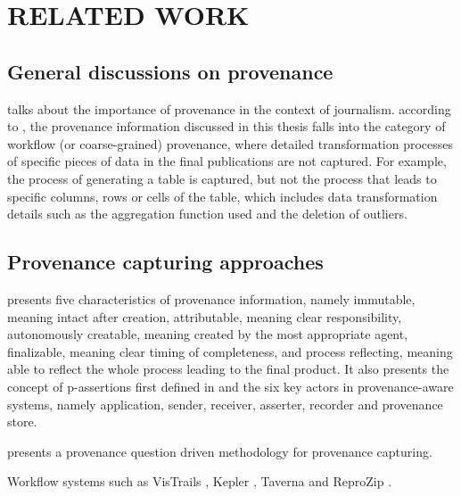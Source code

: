 
\chapter{RELATED WORK}

\section{General discussions on provenance}
\cite{jarvis2010importance} talks about the importance of provenance in the context of journalism. 
according to \cite{tan2007provenance}, the provenance information discussed in this thesis falls into the category of workflow (or coarse-grained) provenance, where detailed transformation processes of specific pieces of data in the final publications are not captured. For example, the process of generating a table is captured, but not the process that leads to specific columns, rows or cells of the table, which includes data transformation details such as the aggregation function used and the deletion of outliers.

\section{Provenance capturing approaches}
\cite{groth2009recording} presents five characteristics of provenance information, namely immutable, meaning intact after creation, attributable, meaning clear responsibility, autonomously creatable, meaning created by the most appropriate agent, finalizable, meaning clear timing of completeness, and process reflecting, meaning able to reflect the whole process leading to the final product. It also presents the concept of p-assertions first defined in \cite{groth2006architecture} and the six key actors in provenance-aware systems, namely application, sender, receiver, asserter, recorder and provenance store.

\cite{miles2011prime} presents a provenance question driven methodology for provenance capturing.

Workflow systems such as VisTrails \cite{freire2014reproducibility}, Kepler \cite{ludascher2006scientific}, Taverna \cite{wolstencroft2013taverna} and ReproZip \cite{chirigati2013reprozip}.

